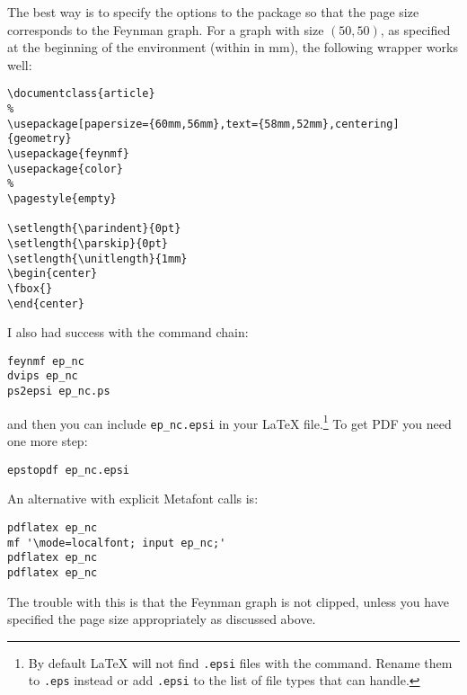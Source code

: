 The best way is to specify the options to the 
package so that the page size corresponds to the Feynman graph. For a
graph with size $(50,50)$, as specified at the beginning of the
 environment (within  in \si{\mm}), the
following wrapper works well:
\begin{verbatim}
\documentclass{article}
%
\usepackage[papersize={60mm,56mm},text={58mm,52mm},centering]{geometry}
\usepackage{feynmf}
\usepackage{color}
%
\pagestyle{empty}

\setlength{\parindent}{0pt}
\setlength{\parskip}{0pt}
\setlength{\unitlength}{1mm}
\begin{center}
\fbox{}
\end{center}

\end{verbatim}

I also had success with the command chain:
\begin{verbatim}
feynmf ep_nc
dvips ep_nc
ps2epsi ep_nc.ps
\end{verbatim}
and then you can include \texttt{ep\_nc.epsi} in your \LaTeX
file.\footnote{By default \LaTeX{} will not find \texttt{.epsi} files
  with the  command. Rename them to
  \texttt{.eps} instead or add \texttt{.epsi} to the list of file
  types that  can handle.} To
get PDF you need one more step:
\begin{verbatim}
epstopdf ep_nc.epsi
\end{verbatim}

An alternative with explicit Metafont calls is:
\begin{verbatim}
pdflatex ep_nc
mf '\mode=localfont; input ep_nc;'
pdflatex ep_nc
pdflatex ep_nc
\end{verbatim}
The trouble with this is that the Feynman graph is not clipped, unless
you have specified the page size appropriately as discussed above.


